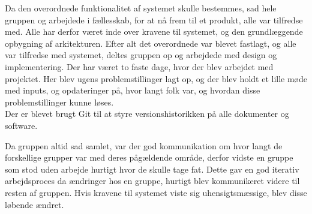 Da den overordnede funktionalitet af systemet skulle bestemmes, sad hele gruppen og arbejdede i fællesskab, for at nå frem til et produkt, alle var tilfredse med.
Alle har derfor været inde over kravene til systemet, og den grundlæggende opbygning af arkitekturen.
Efter alt det overordnede var blevet fastlagt, og alle var tilfredse med systemet, deltes gruppen op og arbejdede med design og implementering.
Der har været to faste dage, hvor der blev arbejdet med projektet. Her blev ugens problemstillinger lagt op, og der blev holdt et lille møde med inputs, og opdateringer på, hvor langt folk var, og hvordan disse problemstillinger kunne løses. \\
Der er blevet brugt Git til at styre versionshistorikken på alle dokumenter og software. 

Da gruppen altid sad samlet, var der god kommunikation om hvor langt de forskellige grupper var med deres pågældende område,  derfor vidste en gruppe som stod uden arbejde hurtigt hvor de skulle tage fat.
Dette gav en god iterativ arbejdsproces da ændringer hos en gruppe, hurtigt blev kommunikeret videre til resten af gruppen. 
Hvis kravene til systemet viste sig uhensigtsmæssige, blev disse løbende ændret. \\

